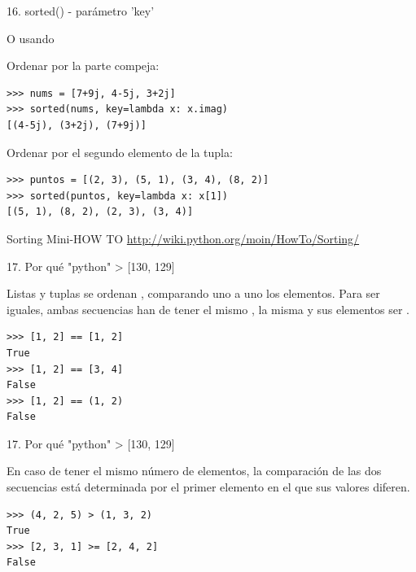 \documentclass[14pt]{beamer}
\begin{document}
\begin{frame}[fragile]{16. sorted() - parámetro 'key'}
  \begin{block}{}
    \centering
    O usando 
  \end{block}

  \footnotesize
  \begin{exampleblock}
    {Ordenar por la parte compeja:}
    \begin{lstlisting}
>>> nums = [7+9j, 4-5j, 3+2j]
>>> sorted(nums, key=lambda x: x.imag)
[(4-5j), (3+2j), (7+9j)]
    \end{lstlisting}
  \end{exampleblock}

  \begin{exampleblock}
    {Ordenar por el segundo elemento de la tupla:}
    \begin{lstlisting}
>>> puntos = [(2, 3), (5, 1), (3, 4), (8, 2)]
>>> sorted(puntos, key=lambda x: x[1])
[(5, 1), (8, 2), (2, 3), (3, 4)]
    \end{lstlisting}
  \end{exampleblock}

  \begin{block}
    {\centering Sorting Mini-HOW TO}
    \centering \url{http://wiki.python.org/moin/HowTo/Sorting/}
  \end{block}
\end{frame}

\begin{frame}[fragile]{17. Por qué "python" > [130, 129]}
  \small
  \begin{block}{}
    \centering
    Listas y tuplas se ordenan ,
    comparando uno a uno los elementos. Para ser iguales, ambas
    secuencias han de tener el mismo , la misma
     y sus elementos ser .
  \end{block}

  \begin{exampleblock}{}
    \begin{lstlisting}
>>> [1, 2] == [1, 2]
True
>>> [1, 2] == [3, 4]
False
>>> [1, 2] == (1, 2)
False
    \end{lstlisting}
  \end{exampleblock}
\end{frame}

\begin{frame}[fragile]{17. Por qué "python" > [130, 129]}
  \small
  \begin{alertblock}{}
    \centering
    En caso de  tener el mismo número de elementos, la
    comparación de las dos secuencias está determinada por el primer
    elemento en el que sus valores diferen.
  \end{alertblock}

  \begin{exampleblock}{}
    \begin{lstlisting}
>>> (4, 2, 5) > (1, 3, 2)
True
>>> [2, 3, 1] >= [2, 4, 2]
False
    \end{lstlisting}
  \end{exampleblock}
\end{frame}
\end{document}
